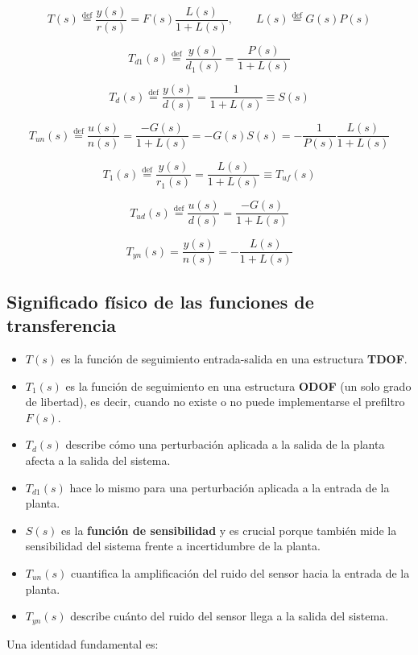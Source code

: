 \[
T(s)\stackrel{\text{def}}{=}\frac{y(s)}{r(s)}=F(s)\frac{L(s)}{1+L(s)}, 
\qquad 
L(s)\stackrel{\text{def}}{=}G(s)P(s) \tag{2.1.1}
\]

\[
T_{d1}(s)\stackrel{\text{def}}{=}\frac{y(s)}{d_1(s)}=\frac{P(s)}{1+L(s)} \tag{2.1.2}
\]

\[
T_d(s)\stackrel{\text{def}}{=}\frac{y(s)}{d(s)}=\frac{1}{1+L(s)}\equiv S(s) \tag{2.1.3}
\]

\[
T_{un}(s)\stackrel{\text{def}}{=}\frac{u(s)}{n(s)}
=\frac{-G(s)}{1+L(s)}
=-G(s)S(s)
=-\frac{1}{P(s)}\frac{L(s)}{1+L(s)} \tag{2.1.4}
\]

\[
T_1(s)\stackrel{\text{def}}{=}\frac{y(s)}{r_1(s)}=\frac{L(s)}{1+L(s)}\equiv T_{uf}(s) \tag{2.1.5}
\]

\[
T_{ud}(s)\stackrel{\text{def}}{=}\frac{u(s)}{d(s)}=\frac{-G(s)}{1+L(s)} \tag{2.1.6}
\]

\[
T_{yn}(s)=\frac{y(s)}{n(s)}=-\frac{L(s)}{1+L(s)} \tag{2.1.7}
\]

\subsection{Significado físico de las funciones de transferencia}
\begin{itemize}
  \item \textbf{\(T(s)\)} es la función de seguimiento entrada-salida en una estructura \textbf{TDOF}.
  \item \textbf{\(T_1(s)\)} es la función de seguimiento en una estructura \textbf{ODOF} (un solo grado de libertad), es decir, cuando no existe o no puede implementarse el prefiltro \(F(s)\).
  \item \textbf{\(T_d(s)\)} describe cómo una perturbación aplicada a la salida de la planta afecta a la salida del sistema.
  \item \textbf{\(T_{d1}(s)\)} hace lo mismo para una perturbación aplicada a la entrada de la planta.
  \item \textbf{\(S(s)\)} es la \textbf{función de sensibilidad} y es crucial porque también mide la sensibilidad del sistema frente a incertidumbre de la planta.
  \item \textbf{\(T_{un}(s)\)} cuantifica la amplificación del ruido del sensor hacia la entrada de la planta.
  \item \textbf{\(T_{yn}(s)\)} describe cuánto del ruido del sensor llega a la salida del sistema.
\end{itemize}

Una identidad fundamental es:

